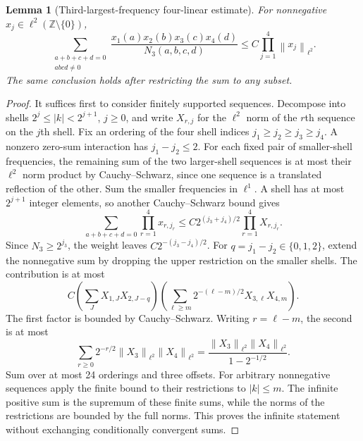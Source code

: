 \documentclass[11pt]{article}
\newtheorem{lemma}[theorem]{Lemma}
\theoremstyle{remark}\newtheorem{remark}[theorem]{Remark}
\newcommand{\Z}{\mathbb Z}
\newcommand{\norm}[2][]{\left\lVert #2\right\rVert_{#1}}
\newcommand{\abs}[1]{\left|#1\right|}
\begin{document}
\begin{lemma}[Third-largest-frequency four-linear estimate]\label{lem:fourlinear}
For nonnegative $x_j\in\ell^2(\Z\setminus\{0\})$,
\begin{equation}\label{eq:fourlinear}
\sum_{\substack{a+b+c+d=0\\abcd\ne0}}
\frac{x_1(a)x_2(b)x_3(c)x_4(d)}{N_3(a,b,c,d)}
\leq C\prod_{j=1}^4\norm[\ell^2]{x_j}.
\end{equation}
The same conclusion holds after restricting the sum to any subset.
\end{lemma}
\begin{proof}
It suffices first to consider finitely supported sequences. Decompose into
shells $2^j\leq\abs k<2^{j+1}$, $j\geq0$, and write $X_{r,j}$ for the
$\ell^2$ norm of the $r$th sequence on the $j$th shell. Fix an ordering
of the four shell indices $j_1\geq j_2\geq j_3\geq j_4$.
A nonzero zero-sum interaction has $j_1-j_2\leq2$.
For each fixed pair of smaller-shell frequencies, the remaining sum of the
two larger-shell sequences is at most their $\ell^2$ norm product by
Cauchy--Schwarz, since one sequence is a translated reflection of the other.
Sum the smaller frequencies in $\ell^1$. A shell has at most $2^{j+1}$
integer elements, so another Cauchy--Schwarz bound gives
\[
\sum_{a+b+c+d=0}\prod_{r=1}^4 x_{r,j_r}
\leq C2^{(j_3+j_4)/2}\prod_{r=1}^4X_{r,j_r}.
\]
Since $N_3\geq2^{j_3}$, the weight leaves
$C2^{-(j_3-j_4)/2}$. For $q=j_1-j_2\in\{0,1,2\}$, extend the nonnegative
sum by dropping the upper restriction on the smaller shells. The contribution
is at most
\[
C\left(\sum_JX_{1,J}X_{2,J-q}\right)
\left(\sum_{\ell\geq m}2^{-(\ell-m)/2}X_{3,\ell}X_{4,m}\right).
\]
The first factor is bounded by Cauchy--Schwarz. Writing $r=\ell-m$, the second
is at most
\[
\sum_{r\geq0}2^{-r/2}\norm[\ell^2]{X_3}\norm[\ell^2]{X_4}
=\frac{\norm[\ell^2]{X_3}\norm[\ell^2]{X_4}}{1-2^{-1/2}}.
\]
Sum over at most 24 orderings and three offsets. For arbitrary nonnegative
sequences apply the finite bound to their restrictions to $|k|\leq m$.
The infinite positive sum is the supremum of these finite sums, while the
norms of the restrictions are bounded by the full norms. This proves the
infinite statement without exchanging conditionally convergent sums.
\end{proof}
\end{document}
